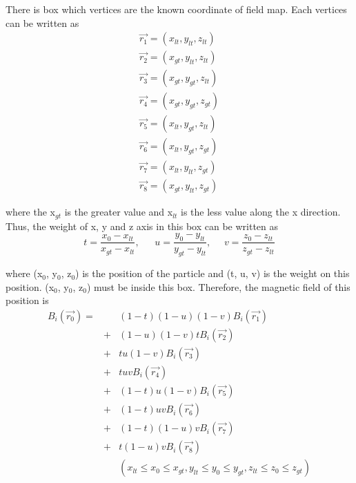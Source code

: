 There is box which vertices are the known coordinate of field map.
Each vertices can be written as
\begin{eqnarray}
 \vec{r_1} = (x_{lt}, y_{lt}, z_{lt}) \nonumber \\
 \vec{r_2} = (x_{gt}, y_{lt}, z_{lt}) \nonumber \\
 \vec{r_3} = (x_{gt}, y_{gt}, z_{lt}) \nonumber \\
 \vec{r_4} = (x_{gt}, y_{gt}, z_{gt}) \nonumber \\
 \vec{r_5} = (x_{lt}, y_{gt}, z_{lt}) \nonumber \\
 \vec{r_6} = (x_{lt}, y_{gt}, z_{gt}) \nonumber \\
 \vec{r_7} = (x_{lt}, y_{lt}, z_{gt}) \nonumber \\
 \vec{r_8} = (x_{gt}, y_{lt}, z_{gt})
\end{eqnarray}

where the x$_{gt}$ is the greater value and x$_{lt}$ is the less value along the x direction.
Thus, the weight of x, y and z axis in this box can be written as
\begin{equation}
 t = \frac{x_0-x_{lt}}{x_{gt}-x_{lt}}, ~~~~~~~u = \frac{y_0-y_{lt}}{y_{gt}-y_{lt}}, ~~~~~~v = \frac{z_0-z_{lt}}{z_{gt}-z_{lt}}
\end{equation}

where (x$_0$, y$_0$, z$_0$) is the position of the particle and (t, u, v) is the weight on this position.
(x$_0$, y$_0$, z$_0$) must be inside this box.
Therefore, the magnetic field of this position is
\begin{eqnarray}
 B_i(\vec{r_0}) = &&(1-t)(1-u)(1-v) B_i(\vec{r_1})   \nonumber \\
 				  &+& (1-u)(1-v)t B_i(\vec{r_2})	 \nonumber \\
				  &+& tu(1-v) B_i(\vec{r_3})		 \nonumber \\
				  &+& tuv B_i(\vec{r_4})			 \nonumber \\
				  &+& (1-t)u(1-v) B_i(\vec{r_5})	 \nonumber \\
				  &+& (1-t)uv B_i(\vec{r_6})		 \nonumber \\
				  &+& (1-t)(1-u)v B_i(\vec{r_7})	 \nonumber \\
				  &+& t(1-u)v B_i(\vec{r_8})				   \\
&& (x_{lt} \le x_0 \le x_{gt}, y_{lt} \le y_0 \le y_{gt}, z_{lt} \le z_0 \le z_{gt})	  \nonumber 
\end{eqnarray}
